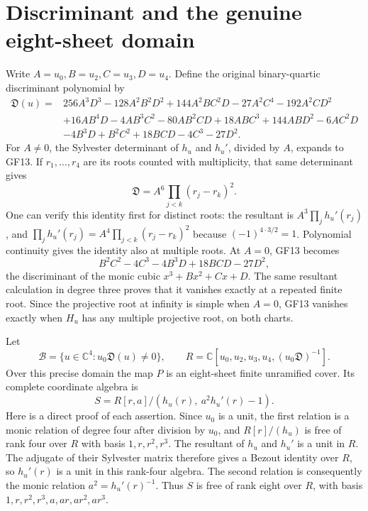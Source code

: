 \documentclass[11pt]{article}
\newcommand{\C}{\mathbb C}
\begin{document}
\section{Discriminant and the genuine eight-sheet domain}
Write $A=u_0,B=u_2,C=u_3,D=u_4$. Define the original binary-quartic
discriminant polynomial by
\begin{align}
 \mathfrak D(u)={}&256A^3D^3-128A^2B^2D^2+144A^2BC^2D
 -27A^2C^4-192A^2CD^2\nonumber\\
 &+16AB^4D-4AB^3C^2-80AB^2CD+18ABC^3
 +144ABD^2-6AC^2D\nonumber\\
 &-4B^3D+B^2C^2+18BCD-4C^3-27D^2.
 \tag{GF13}
\end{align}
For $A\ne0$, the Sylvester determinant of $h_u$ and $h_u'$,
divided by $A$, expands to GF13. If $r_1,\ldots,r_4$ are its
roots counted with multiplicity, that same determinant gives
\begin{equation}
 \mathfrak D=A^6\prod_{j<k}(r_j-r_k)^2.\tag{GF14}
\end{equation}
One can verify this identity first for distinct roots: the
resultant is $A^3\prod_jh_u'(r_j)$, and
$\prod_jh_u'(r_j)=A^4\prod_{j<k}(r_j-r_k)^2$ because
$(-1)^{4\cdot3/2}=1$. Polynomial continuity gives the identity
also at multiple roots. At $A=0$, GF13 becomes
\[
 B^2C^2-4C^3-4B^3D+18BCD-27D^2,
\]
the discriminant of the monic cubic $x^3+Bx^2+Cx+D$. The same
resultant calculation in degree three proves that it vanishes
exactly at a repeated finite root. Since the projective root at
infinity is simple when $A=0$, GF13 vanishes exactly when $H_u$
has any multiple projective root, on both charts.

Let
\begin{equation}
 \mathcal B=\{u\in\C^4:u_0\mathfrak D(u)\ne0\},\qquad
 R=\C[u_0,u_2,u_3,u_4,(u_0\mathfrak D)^{-1}].\tag{GF15}
\end{equation}
Over this precise domain the map $P$ is an eight-sheet finite
unramified cover. Its complete coordinate algebra is
\begin{equation}
 S=R[r,a]/(h_u(r),\ a^2h_u'(r)-1).\tag{GF16}
\end{equation}
Here is a direct proof of each assertion. Since $u_0$ is a unit,
the first relation is a monic relation of degree four after division
by $u_0$, and $R[r]/(h_u)$ is free of rank four over $R$ with basis
$1,r,r^2,r^3$. The resultant of $h_u$ and $h_u'$ is a unit in $R$.
The adjugate of their Sylvester matrix therefore gives a Bezout
identity over $R$, so $h_u'(r)$ is a unit in this rank-four algebra.
The second relation is consequently the monic relation
$a^2=h_u'(r)^{-1}$. Thus $S$ is free of rank eight over $R$, with
basis $1,r,r^2,r^3,a,ar,ar^2,ar^3$.
\end{document}
